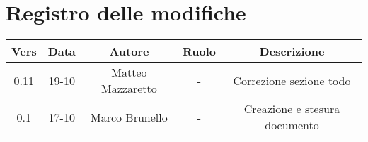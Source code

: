 \section{Registro delle modifiche}

\begin{table}[htbp]
	\begin{tabular}{|c|c|c|c|c|}
		\hline
		\rowcolor[gray]{0.9}
		Vers & Data & Autore & Ruolo & Descrizione \\
		\hline
		0.11 & 19-10 & Matteo Mazzaretto & - & Correzione sezione todo \\
		\hline
		0.1 & 17-10 & Marco Brunello & - & Creazione e stesura documento \\
		\hline
	\end{tabular}
\end{table}